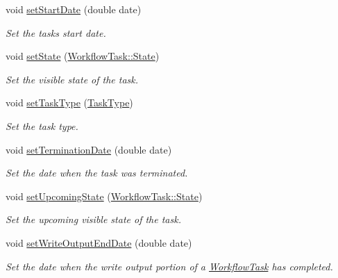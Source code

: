 \begin{DoxyCompactItemize}
void \hyperlink{classwrench_1_1_workflow_task_a8ef6d18ed65d9815bf8ebf2dcc3549da}{set\+Start\+Date} (double date)
\begin{DoxyCompactList}\small\item\em Set the task\textquotesingle{}s start date. \end{DoxyCompactList}\item 
void \hyperlink{classwrench_1_1_workflow_task_a5f2f2a4897400b5f78f4fe193e66342f}{set\+State} (\hyperlink{classwrench_1_1_workflow_task_a1184f3d7aea21e1c87a9b17e84f1f92a}{Workflow\+Task\+::\+State})
\begin{DoxyCompactList}\small\item\em Set the visible state of the task. \end{DoxyCompactList}\item 
void \hyperlink{classwrench_1_1_workflow_task_ab10c4b26c9f669dd39c9bf76b597abf9}{set\+Task\+Type} (\hyperlink{classwrench_1_1_workflow_task_a490a935259b9425a3e4fb011a86cb4bf}{Task\+Type})
\begin{DoxyCompactList}\small\item\em Set the task type. \end{DoxyCompactList}\item 
void \hyperlink{classwrench_1_1_workflow_task_ae3ef50f03b899d787a4514ff5e3dda9f}{set\+Termination\+Date} (double date)
\begin{DoxyCompactList}\small\item\em Set the date when the task was terminated. \end{DoxyCompactList}\item 
void \hyperlink{classwrench_1_1_workflow_task_a6856c2c6b70109a061dc979a7417ef9d}{set\+Upcoming\+State} (\hyperlink{classwrench_1_1_workflow_task_a1184f3d7aea21e1c87a9b17e84f1f92a}{Workflow\+Task\+::\+State})
\begin{DoxyCompactList}\small\item\em Set the upcoming visible state of the task. \end{DoxyCompactList}\item 
void \hyperlink{classwrench_1_1_workflow_task_a6bd42ca8962628852c3ab7b16e81bd1c}{set\+Write\+Output\+End\+Date} (double date)
\begin{DoxyCompactList}\small\item\em Set the date when the write output portion of a \hyperlink{classwrench_1_1_workflow_task}{Workflow\+Task} has completed. \end{DoxyCompactList}\item 

\end{DoxyCompactItemize}
